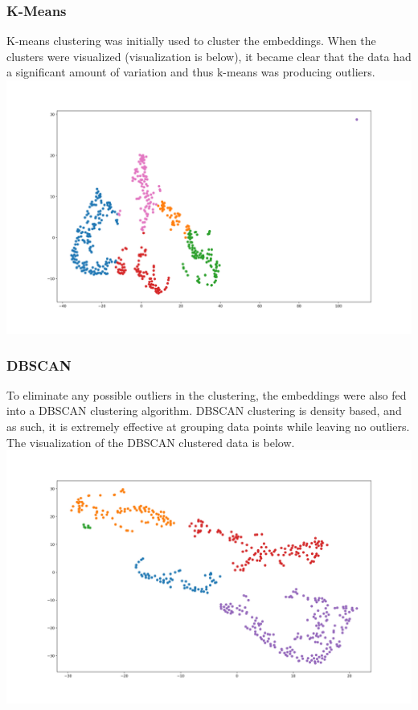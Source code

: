 \documentclass[11pt]{article}
\newcommand{\np}{\newpage}
\begin{document}
\subsubsection{K-Means}
K-means clustering was initially used to cluster the embeddings.  When the clusters were visualized (visualization is below), it became clear that the data had a significant amount of variation and thus k-means was producing outliers.\\[2mm]
\includegraphics[scale=.3]{tsne_knn.png}
\subsubsection{DBSCAN}
To eliminate any possible outliers in the clustering, the embeddings were also fed into a DBSCAN clustering algorithm.  DBSCAN clustering is density based, and as such, it is extremely effective at grouping data points while leaving no outliers.  The visualization of the DBSCAN clustered data is below.\\[2mm]
\includegraphics[scale=.3]{dbscan.png}
\np
\end{document}
